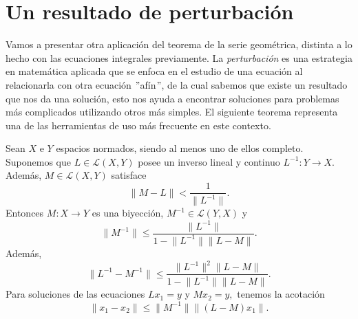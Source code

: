 \section{Un resultado de perturbación}
Vamos a presentar otra aplicación del teorema de la serie geométrica, distinta a lo hecho con las ecuaciones integrales previamente.
La \textit{perturbación} es una estrategia en matemática aplicada que se enfoca en el estudio de una ecuación al relacionarla con otra ecuación $"$afín$"$, de la cual sabemos que existe un resultado que nos da una solución, esto nos ayuda a encontrar soluciones para problemas más complicados utilizando otros más simples. El siguiente teorema representa una de las herramientas de uso más frecuente en este contexto.

\begin{teorema}
	Sean $X$ e $Y$ espacios normados, siendo al menos uno de ellos completo. Suponemos que $L \in \mathcal{L}(X,Y)$ posee un inverso lineal y continuo $L^{-1}: Y \rightarrow X.$ Además, $M \in \mathcal{L}(X,Y)$ satisface
	\begin{equation}\label{eq:teo7}
		\lVert M-L \rVert < \dfrac{1}{\lVert L^{-1} \rVert}.
	\end{equation}
	Entonces $M:X\rightarrow Y$ es una biyección, $M^{-1} \in \mathcal{L}(Y,X)$ y 
	\begin{equation}\label{eq:teo5}
		\lVert M^{-1} \rVert \leqslant \dfrac{\lVert L^{-1} \rVert}{1 - \lVert L^{-1} \rVert \lVert L-M \rVert}.
	\end{equation}
	Además,
	\begin{equation}\label{eq:teo4}
		\lVert L^{-1} - M^{-1} \rVert \leqslant \dfrac{\lVert L^{-1} \rVert^2 \lVert L-M \rVert}{1 - \lVert L^{-1} \rVert \lVert L-M \rVert}.
	\end{equation}
	Para soluciones de las ecuaciones $Lx_1 = y$ y $Mx_2 = y,$ tenemos la acotación
	\begin{equation}\label{eq:teo6}
		\lVert x_1 - x_2 \rVert \leqslant \lVert M^{-1} \rVert \lVert (L-M)x_1 \rVert.
	\end{equation}
\end{teorema}
